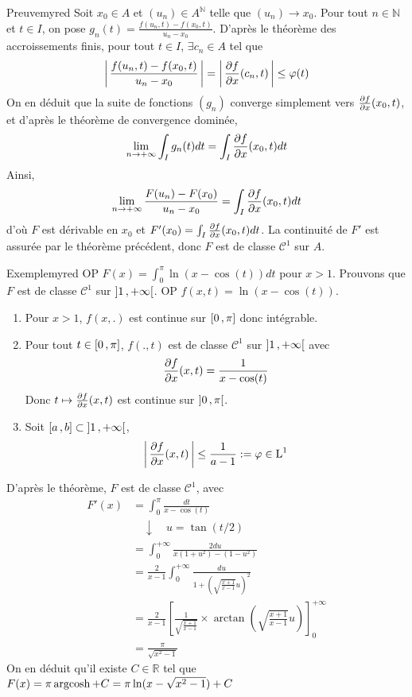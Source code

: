     \begin{demo}{Preuve}{myred}
        Soit $x_0 \in A$ et $(u_n) \in A^{\mathbb{N}}$ telle que $(u_n) \to x_0$. Pour tout $n \in \mathbb{N}$ et $t \in I$, on pose $g_n(t) = \frac{f(u_n,t) - f(x_0,t)}{u_n - x_0}$. D’après le théorème des accroissements finis, pour tout $t \in I$, $\exists c_n \in A$ tel que 
        \[ \left\lvert \,\frac{f(u_n,t) - f(x_0,t)}{u_n - x_0} \, \right\rvert = \left\lvert \,\frac{\partial f}{\partial x}(c_n,t) \, \right\rvert \leq \varphi(t) \]   
        On en déduit que la suite de fonctions $(g_n)$ converge simplement vers $\frac{\partial f}{\partial x}(x_0,t)$, et d’après le théorème de convergence dominée, 
        \[ \lim_{n \to +\infty} \int_I g_n(t)dt = \int_I \frac{\partial f}{\partial x}(x_0,t)dt \] 
        Ainsi, 
        \[ \lim_{n \to +\infty} \frac{F(u_n) - F(x_0)}{u_n - x_0} = \int_I \frac{\partial f}{\partial x}(x_0,t)dt \] d’où $F$ est dérivable en $x_0$ et $F'(x_0) = \int_I \frac{\partial f}{\partial x}(x_0,t)dt$. La continuité de $F'$ est assurée par le théorème précédent, donc $F$ est de classe $\mathcal{C}^1$ sur $A$.  
    \end{demo}

    \begin{omed}{Exemple}{myred}
        OP $F(x) = \int_{0}^{\pi} \ln(x - \cos(t))dt$ pour $x > 1$. Prouvons que $F$ est de classe $\mathcal{C}^1$ sur $\left] 1 \, , +\infty \right[$. OP $f(x,t) = \ln(x - \cos(t))$.
        \begin{enumerate}
            \item Pour $x > 1$, $f(x,.)$ est continue sur $\left[ 0 \, , \pi \right]$ donc intégrable.
            \item Pour tout $t \in \left[ 0 \, , \pi \right]$, $f(.,t)$ est de classe $\mathcal{C}^1$ sur $\left] 1 \, , +\infty \right[$ avec 
            \[ \frac{\partial f}{\partial x}(x,t) = \frac{1}{x - \cos(t)} \]   
            Donc $t \mapsto \frac{\partial f}{\partial x}(x,t)$ est continue sur $\left] 0 \, , \pi \right[$.
            \item Soit $\left[ a \, , b \right] \subset \left] 1 \, , +\infty \right[$, 
            \[ \left\lvert \,\frac{\partial f}{\partial x}(x,t) \, \right\rvert \leq \frac{1}{a-1} := \varphi \in \operatorname{L}^1 \]   
        \end{enumerate}
        D’après le théorème, $F$ est de classe $\mathcal{C}^1$, avec 
        \begin{align*}
            F'(x) &= \int_{0}^{\pi} \frac{dt}{x - \cos(t)} \\
            &\quad \downarrow \quad u = \tan(t / 2) \\
            &= \int_{0}^{+\infty} \frac{2 du}{x(1 + u^2) - (1 - u^2)} \\
            &= \frac{2}{x-1} \int_{0}^{+\infty} \frac{du}{1 + \left(\sqrt{\frac{x+1}{x-1}} u\right)^2} \\
            &= \frac{2}{x-1} \left[\frac{1}{\sqrt{\frac{x+1}{x-1}}} \times \arctan\left(\sqrt{\frac{x+1}{x-1}} u\right)\right]^{+\infty}_0 \\
            &= \frac{\pi}{\sqrt{x^2 - 1}}
        \end{align*}
        On en déduit qu’il existe $C \in \mathbb{R}$ tel que $F(x) = \pi \operatorname{argcosh} + C = \pi \ln(x - \sqrt{x^2 - 1}) + C$
    \end{omed}

